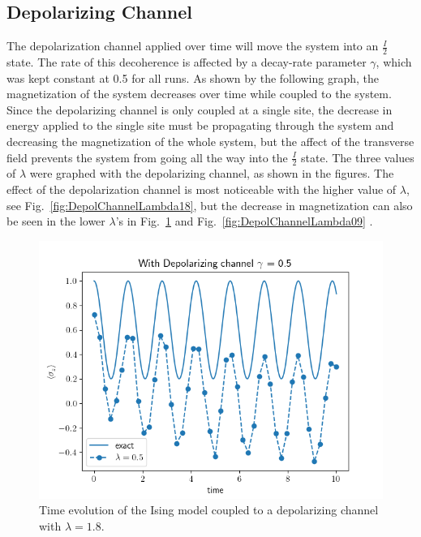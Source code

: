\documentclass[12pt, twocolumn]{article}
\begin{document}
  \subsection{Depolarizing Channel}
  The depolarization channel applied over time will move the system into an \( \frac{I}{2} \) state. The rate of this decoherence is affected by a decay-rate parameter \( \gamma \), which was kept constant at 0.5 for all runs. As shown by the following graph, the magnetization of the system decreases over time while coupled to the system. Since the depolarizing channel is only coupled at a single site, the decrease in energy applied to the single site must be propagating through the system and decreasing the magnetization of the whole system, but the affect of the transverse field prevents the system from going all the way into the \( \frac{I}{2} \) state. The three values of \( \lambda \) were graphed with the depolarizing channel, as shown in the figures. The effect of the depolarization channel is most noticeable with the higher value of \( \lambda \), see Fig.~\ref{fig:DepolChannelLambda18},  but the decrease in magnetization can also be seen in the lower \( \lambda \)'s in Fig.~\ref{fig:DepolChannelLambda05} and Fig.~\ref{fig:DepolChannelLambda09} .

  \begin{figure}%
    \centering
    \includegraphics[width=\columnwidth]{images/DepolChannelLambda05.png}
    \caption{Time evolution of the Ising model coupled to a depolarizing channel with \( \lambda = 1.8 \).%
      \label{fig:DepolChannelLambda05}}
  \end{figure}
\end{document}
